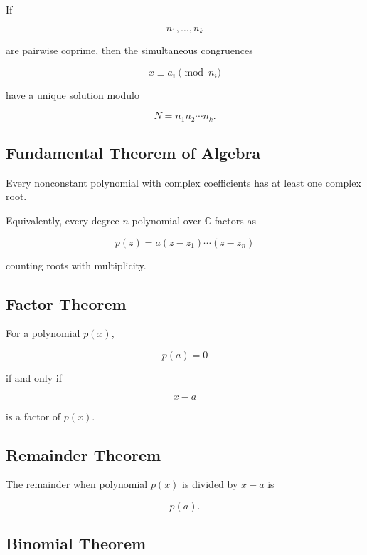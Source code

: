 If

\[
n_1,\ldots,n_k
\]

are pairwise coprime, then the simultaneous congruences

\[
x\equiv a_i\pmod{n_i}
\]

have a unique solution modulo

\[
\boxed{
N=n_1n_2\cdots n_k.
}
\]

\subsection{Fundamental Theorem of Algebra}
\label{subsec:fundamental-theorem-algebra-summary}

Every nonconstant polynomial with complex coefficients has at least one
complex root.

Equivalently, every degree-\(n\) polynomial over \(\mathbb{C}\) factors as

\[
\boxed{
p(z)
=
a
(z-z_1)\cdots(z-z_n)
}
\]

counting roots with multiplicity.

\subsection{Factor Theorem}
\label{subsec:factor-theorem-summary}

For a polynomial \(p(x)\),

\[
\boxed{
p(a)=0
}
\]

if and only if

\[
\boxed{
x-a
}
\]

is a factor of \(p(x)\).

\subsection{Remainder Theorem}
\label{subsec:remainder-theorem-summary}

The remainder when polynomial \(p(x)\) is divided by \(x-a\) is

\[
\boxed{
p(a).
}
\]

\subsection{Binomial Theorem}
\label{subsec:binomial-theorem-summary}

